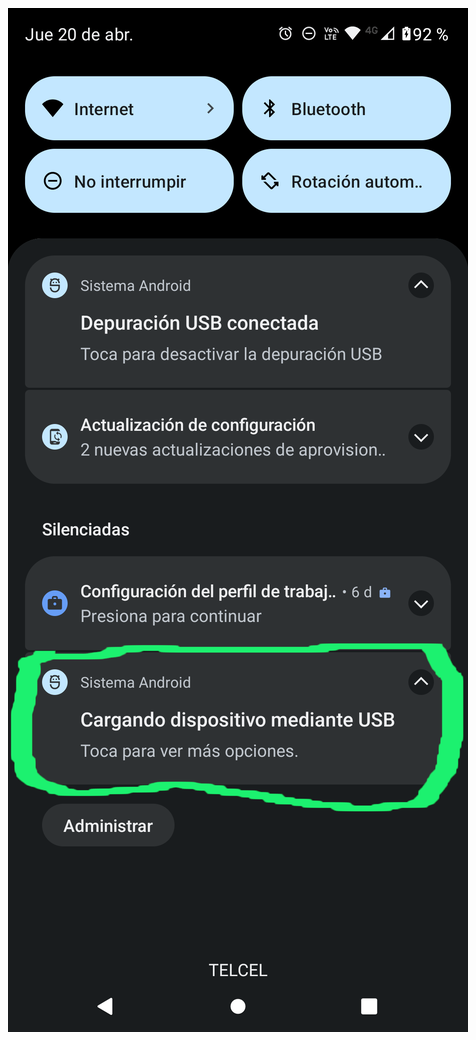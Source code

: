 \begin{frame}
\begin{columns}
\begin{center}
\end{center}

\begin{center}
\includegraphics[width=0.95\linewidth]{00_Configurar/ModoConexion1.png}    
\end{center}


\end{columns}
\end{frame}

